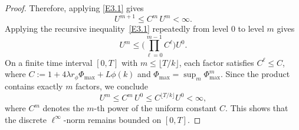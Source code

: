 \documentclass[final,12pt,3p]{elsarticle}
\theoremstyle{plain}
\theoremstyle{definition}
\theoremstyle{remark}
\begin{document}
\begin{proof}
Therefore, applying \eqref{E3.1} gives
\begin{equation*}
U^{m+1} \le C^m \, U^m < \infty.
\end{equation*}
Applying the recursive inequality~\eqref{E3.1} repeatedly 
from level $0$ to level $m$ gives
\begin{equation*}
   U^m \le \biggl(\prod_{\ell=0}^{m-1} C^\ell\biggr) U^0.
\end{equation*}
On a finite time interval $[0,T]$ with $m \le \lfloor T/k \rfloor$, %
each factor satisfies $C^\ell \le C$, where $C := 1 + 4\lambda r_\phi \Phi_{\max} + L\phi(k)$ and $\Phi_{\max} = \sup_m \Phi_{\max}^m$. 
Since the product contains exactly $m$ factors, we conclude
\begin{equation*}
U^m \le C^m \, U^0 \le C^{\lfloor T/k \rfloor} U^0 < \infty,
\end{equation*}
where $C^m$ denotes the $m$-th power of the uniform constant $C$.
This shows that the discrete $\ell^\infty$-norm remains bounded on $[0,T]$.
\end{proof}

\end{document}
